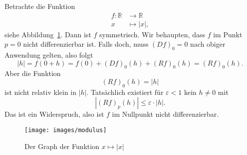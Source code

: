 \documentclass[../main.tex]{subfiles}
\begin{document}
\begin{example}
  Betrachte die Funktion
  \begin{align*}
    f \colon \mathbb{R} & \to \mathbb{R} \\
    x & \mapsto |x|,
  \end{align*}
  siehe Abbildung~\ref{fig:modulus}.
  Dann ist $f$ symmetrisch. Wir behaupten, dass
  $f$ im Punkt $p = 0$ nicht differenzierbar ist.
  Falls doch, muss ${(Df)}_0 = 0$ nach obiger
  Anwendung gelten, also
  folgt
  \[
    |h| = f(0 + h) = f(0) + {(Df)}_0(h) + {(Rf)}_0(h)
    = {(Rf)}_0(h).
  \]
  Aber die Funktion
  \[
    {(Rf)}_0(h) = |h|
  \]
  ist nicht relativ klein in $|h|$. Tatsächlich existiert
  für $\varepsilon < 1$ kein $h \neq 0$ mit
  \[
    |{(Rf)}_p(h)| \leq \varepsilon \cdot |h|.
  \]
  Das ist ein Widerspruch, also ist $f$ im Nullpunkt
  nicht differenzierbar.
\end{example}

\begin{figure}[htb]
  \centering
  \texttt{[image: images/modulus]}
  \caption{Der Graph der Funktion $x \mapsto |x|$}%
  \label{fig:modulus}
\end{figure}
\end{document}
